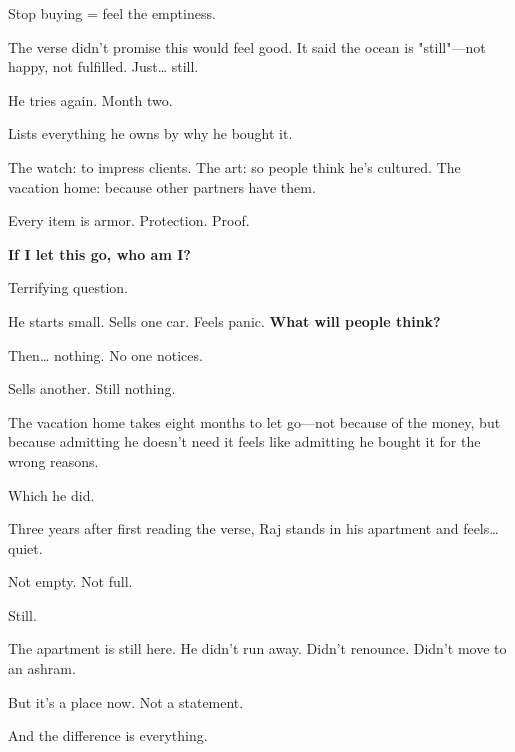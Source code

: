 \documentclass[11pt,twoside]{book}
\begin{document}
Stop buying = feel the emptiness.

The verse didn't promise this would feel good. It said the ocean is "still"—not happy, not fulfilled. Just\ldots{} still.

He tries again. Month two.

Lists everything he owns by why he bought it.

The watch: to impress clients.
The art: so people think he's cultured.
The vacation home: because other partners have them.

Every item is armor. Protection. Proof.

\textbf{If I let this go, who am I?}

Terrifying question.

He starts small. Sells one car. Feels panic. \textbf{What will people think?}

Then\ldots{} nothing. No one notices.

Sells another. Still nothing.

The vacation home takes eight months to let go—not because of the money, but because admitting he doesn't need it feels like admitting he bought it for the wrong reasons.

Which he did.

Three years after first reading the verse, Raj stands in his apartment and feels\ldots{} quiet.

Not empty. Not full.

Still.

The apartment is still here. He didn't run away. Didn't renounce. Didn't move to an ashram.

But it's a place now. Not a statement.

And the difference is everything.
\end{document}
